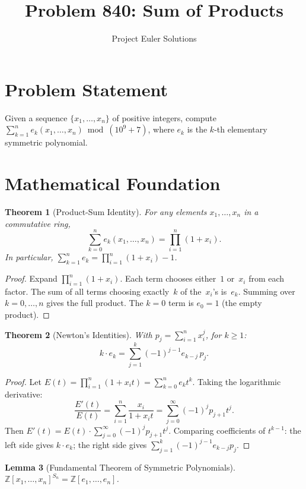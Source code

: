 \documentclass[11pt]{article}
\title{Problem 840: Sum of Products}
\author{Project Euler Solutions}
\date{}
\newtheorem{theorem}{Theorem}
\newtheorem{lemma}[theorem]{Lemma}
\begin{document}
\maketitle

\section{Problem Statement}

Given a sequence $\{x_1,\ldots,x_n\}$ of positive integers, compute $\sum_{k=1}^{n}e_k(x_1,\ldots,x_n)\bmod(10^9+7)$, where $e_k$ is the $k$-th elementary symmetric polynomial.

\section{Mathematical Foundation}

\begin{theorem}[Product-Sum Identity]
For any elements $x_1,\ldots,x_n$ in a commutative ring,
\[
\sum_{k=0}^{n}e_k(x_1,\ldots,x_n) = \prod_{i=1}^{n}(1+x_i).
\]
In particular, $\sum_{k=1}^{n}e_k = \prod_{i=1}^{n}(1+x_i)-1$.
\end{theorem}

\begin{proof}
Expand $\prod_{i=1}^{n}(1+x_i)$. Each term chooses either~$1$ or~$x_i$ from each factor. The sum of all terms choosing exactly~$k$ of the~$x_i$'s is~$e_k$. Summing over $k=0,\ldots,n$ gives the full product. The $k=0$ term is $e_0=1$ (the empty product).
\end{proof}

\begin{theorem}[Newton's Identities]
With $p_j=\sum_{i=1}^{n}x_i^j$, for $k\ge 1$:
\[
k\cdot e_k = \sum_{j=1}^{k}(-1)^{j-1}e_{k-j}\,p_j.
\]
\end{theorem}

\begin{proof}
Let $E(t)=\prod_{i=1}^{n}(1+x_i t)=\sum_{k=0}^{n}e_k t^k$. Taking the logarithmic derivative:
\[
\frac{E'(t)}{E(t)} = \sum_{i=1}^{n}\frac{x_i}{1+x_i t} = \sum_{j=0}^{\infty}(-1)^j p_{j+1}t^j.
\]
Then $E'(t)=E(t)\cdot\sum_{j=0}^{\infty}(-1)^j p_{j+1}t^j$. Comparing coefficients of $t^{k-1}$: the left side gives $k\cdot e_k$; the right side gives $\sum_{j=1}^{k}(-1)^{j-1}e_{k-j}p_j$.
\end{proof}

\begin{lemma}[Fundamental Theorem of Symmetric Polynomials]
$\mathbb{Z}[x_1,\ldots,x_n]^{S_n} = \mathbb{Z}[e_1,\ldots,e_n]$.
\end{lemma}
\end{document}
